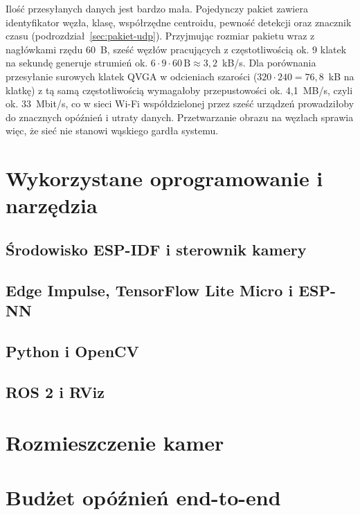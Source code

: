 Ilość przesyłanych danych jest bardzo mała. Pojedynczy pakiet zawiera
identyfikator węzła, klasę, współrzędne centroidu, pewność detekcji oraz
znacznik czasu (podrozdział~\ref{sec:pakiet-udp}). Przyjmując rozmiar
pakietu wraz z nagłówkami rzędu 60~B, sześć węzłów pracujących
z częstotliwością ok. 9 klatek na sekundę generuje strumień ok.
$6 \cdot 9 \cdot 60\,\mathrm{B} \approx 3{,}2$~kB/s.
Dla porównania przesyłanie surowych klatek QVGA w odcieniach szarości
($320 \cdot 240 = 76{,}8$~kB na klatkę) z tą samą częstotliwością
wymagałoby przepustowości ok. 4,1~MB/s, czyli ok. 33~Mbit/s, co w sieci
Wi-Fi współdzielonej przez sześć urządzeń prowadziłoby do znacznych
opóźnień i utraty danych. Przetwarzanie obrazu na węzłach sprawia więc, że
sieć nie stanowi wąskiego gardła systemu.

\section{Wykorzystane oprogramowanie i narzędzia}
\label{sec:oprogramowanie-narzedzia}

\subsection{Środowisko ESP-IDF i sterownik kamery}
\label{subsec:esp-idf-narzedzie}

\subsection{Edge Impulse, TensorFlow Lite Micro i ESP-NN}
\label{subsec:edge-impulse}

\subsection{Python i OpenCV}
\label{subsec:python-opencv}

\subsection{ROS 2 i RViz}
\label{subsec:ros2-rviz}

\section{Rozmieszczenie kamer}
\label{sec:rozmieszczenie}

\section{Budżet opóźnień end-to-end}
\label{sec:budzet-opoznien}
